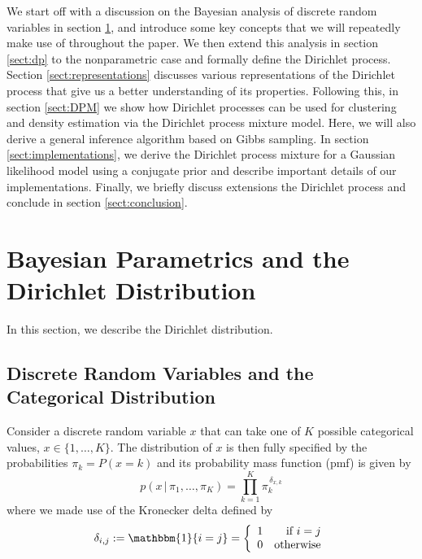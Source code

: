 \documentclass[final,3p,times,twocolumn]{elsarticle}
\begin{document}
We start off with a discussion on the Bayesian analysis of discrete random variables in section \ref{sect:parametric}, and introduce some key concepts that we will repeatedly make use of throughout the paper.
We then extend this analysis in section \ref{sect:dp} to the nonparametric case and formally define the Dirichlet process.
Section \ref{sect:representations} discusses various representations of the Dirichlet process that give us a better understanding of its properties.
Following this, in section \ref{sect:DPM} we show how Dirichlet processes can be used for clustering and density estimation via the Dirichlet process mixture model. 
Here, we will also derive a general inference algorithm based on Gibbs sampling.
In section \ref{sect:implementations}, we derive the Dirichlet process mixture for a Gaussian likelihood model using a conjugate prior and describe important details of our implementations.
Finally, we briefly discuss extensions the Dirichlet process and conclude in section \ref{sect:conclusion}.


\section{Bayesian Parametrics and the Dirichlet Distribution}
\label{sect:parametric}
In this section, we describe the Dirichlet distribution.

\subsection{Discrete Random Variables and the Categorical Distribution}
Consider a discrete random variable $x$ that can take one of $K$ possible categorical values, $x \in \{1,\dots,K\}$.
The distribution of $x$ is then fully specified by the probabilities $\pi_k = P(x = k)$ and its probability mass function (pmf) is given by
\begin{equation}
\label{eqn:catpmf}
p(x\,|\,\pi_1,\dots,\pi_K) = \prod_{k=1}^K \pi_k^{\,\delta_{x,k}}
\end{equation}
where we made use of the Kronecker delta defined by
\begin{equation}
\label{eqn:kronecker}
\delta_{i,j} := \mathbbm{1}\{i = j\} = \left\{\begin{array}{lr}
1 & \mbox{if $i = j$}\\
0 & \mbox{otherwise} \end{array} \right.
\end{equation}
\end{document}
